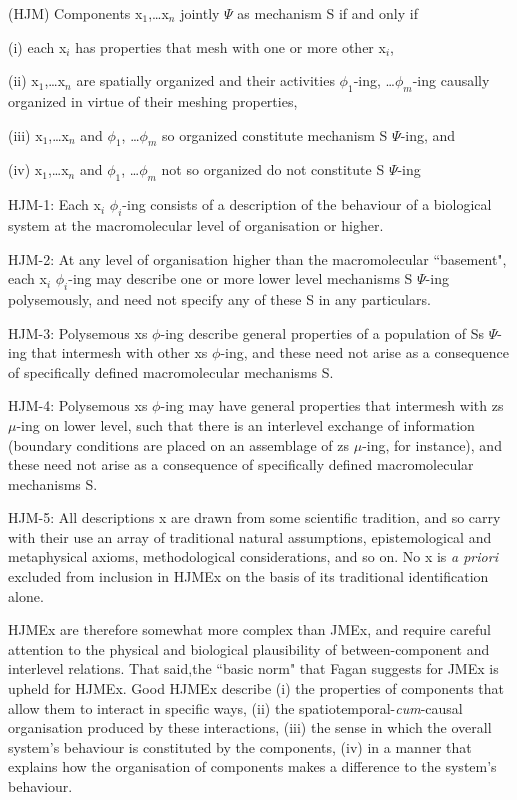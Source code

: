 \begin{longquote}

(HJM) Components x$_1$,\ldots x$_n$ jointly $\Psi$ as mechanism S if and only if

(i) each x$_i$ has properties that mesh with one or more other x$_i$,

(ii) x$_1$,\ldots x$_n$ are spatially organized and their activities $\phi_1$-ing, \ldots $\phi_m$-ing causally organized in virtue of their meshing
properties,

(iii) x$_1$,\ldots x$_n$ and $\phi_1$, \ldots $\phi_m$ so organized constitute mechanism S $\Psi$-ing, and

(iv) x$_1$,\ldots x$_n$ and $\phi_1$, \ldots $\phi_m$ not so organized do not constitute S $\Psi$-ing

HJM-1: Each x$_i$ $\phi_i$-ing consists of a description of the behaviour of a biological system at the macromolecular level of organisation or higher.

HJM-2: At any level of organisation higher than the macromolecular ``basement", each x$_i$ $\phi_i$-ing may describe one or more lower level mechanisms S $\Psi$-ing polysemously, and need not specify any of these S in any particulars.

HJM-3: Polysemous xs $\phi$-ing describe general properties of a population of Ss $\Psi$-ing that intermesh with other xs $\phi$-ing, and these need not arise as a consequence of specifically defined macromolecular mechanisms S.

HJM-4: Polysemous xs $\phi$-ing may have general properties that intermesh with zs $\mu$-ing on lower level, such that there is an interlevel exchange of information (boundary conditions are placed on an assemblage of zs $\mu$-ing, for instance), and these need not arise as a consequence of specifically defined macromolecular mechanisms S.

HJM-5: All descriptions x are drawn from some scientific tradition, and so carry with their use an array of traditional natural assumptions, epistemological and metaphysical axioms, methodological considerations, and so on. No x is \textit{a priori} excluded from inclusion in HJMEx on the basis of its traditional identification alone.

\end{longquote}

HJMEx are therefore somewhat more complex than JMEx, and require careful attention to the physical and biological plausibility of between-component and interlevel relations. That said,the ``basic norm" that Fagan suggests for JMEx is upheld for HJMEx. Good HJMEx describe (i) the properties of components that allow them to interact in specific ways, (ii) the spatiotemporal-\textit{cum}-causal organisation produced by these interactions, (iii) the sense in which the overall system's behaviour is constituted by the components, (iv) in a manner that explains how the organisation of components makes a difference to the system's behaviour.

